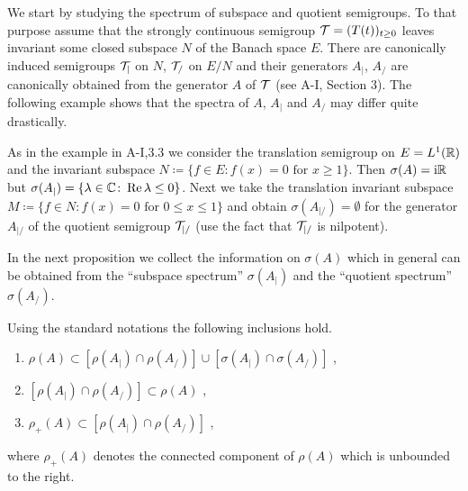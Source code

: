 We start by studying the spectrum of subspace and quotient semigroups.
To that purpose assume that the strongly continuous semigroup $\mathcal{T} = (T(t))_{t \geq 0}$ leaves invariant some closed subspace $N$ of the Banach space $E$.
There are canonically induced semigroups $\mathcal{T}_{|}$ on $N$, \resp $\mathcal{T}_{/}$ on $E/N$ and their generators $A_{|}$, \resp $A_{/}$ are canonically obtained from the generator $A$ of $\mathcal{T}$ (see A-I, Section 3).
The following example shows that the spectra of $A$, $A_{|}$ and $A_{/}$ may differ quite drastically.
\begin{example}\label{ex:a3-4.1}
As in the example in A-I,3.3 we consider the translation semigroup on $E = L^{1}(\mathbb{R})$ and the invariant subspace $N \coloneqq \{f \in E \colon f(x) = 0 \text{ for } x \geq 1\}$.
Then $\sigma(A) = \mathrm{i}\mathbb{R}$ but $\sigma(A_{|}) = \{\lambda \in \mathbb{C} \colon \mathop{}\!\mathrm{Re}\,\lambda \leq 0\}$.
Next we take the translation invariant subspace $M \coloneqq \{f \in N \colon f(x) = 0 \text{ for } 0 \leq x \leq 1\}$ and obtain $\sigma(A_{|/}) = \emptyset$ for the generator $A_{|/}$ of the quotient semigroup $\mathcal{T}_{|/}$ (use the fact that $\mathcal{T}_{|/}$ is nilpotent).
\end{example}
In the next proposition we collect the information on $\sigma(A)$ which in general can be obtained from the \enquote{subspace spectrum} $\sigma(A_{|})$ and the \enquote{quotient spectrum} $\sigma(A_{/})$.
\begin{proposition}\label{prop:a3-4.2}
Using the standard notations the following inclusions hold.
\begin{enumerate}[\upshape (i)]
\item 
$\rho(A) \subset [\rho(A_{|}) \cap \rho(A_{/})] \cup [\sigma(A_{|}) \cap \sigma(A_{/})]$ ,

\item 
$[\rho(A_{|}) \cap \rho(A_{/})] \subset \rho(A) $ ,

\item 
$\rho_{+}(A) \subset [\rho(A_{|}) \cap \rho(A_{/})]$ ,
\end{enumerate}
 where $\rho_{+}(A)$ denotes the connected component of $\rho(A)$ which is unbounded to the right.

\end{proposition}
